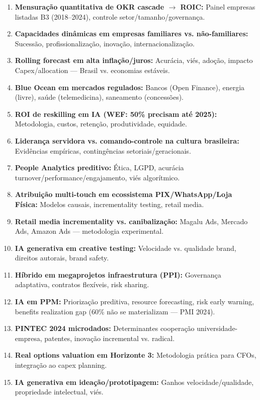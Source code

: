 \begin{enumerate}
    \item \textbf{Mensuração quantitativa de OKR cascade $\rightarrow$ ROIC:} Painel empresas listadas B3 (2018–2024), controle setor/tamanho/governança.
    \item \textbf{Capacidades dinâmicas em empresas familiares vs. não-familiares:} Sucessão, profissionalização, inovação, internacionalização.
    \item \textbf{Rolling forecast em alta inflação/juros:} Acurácia, viés, adoção, impacto Capex/allocation — Brasil vs. economias estáveis.
    \item \textbf{Blue Ocean em mercados regulados:} Bancos (Open Finance), energia (livre), saúde (telemedicina), saneamento (concessões).
    \item \textbf{ROI de reskilling em IA (WEF: 50\% precisam até 2025):} Metodologia, custos, retenção, produtividade, equidade.
    \item \textbf{Liderança servidora vs. comando-controle na cultura brasileira:} Evidências empíricas, contingências setoriais/geracionais.
    \item \textbf{People Analytics preditivo:} Ética, LGPD, acurácia turnover/performance/engajamento, viés algorítmico.
    \item \textbf{Atribuição multi-touch em ecossistema PIX/WhatsApp/Loja Física:} Modelos causais, incrementality testing, retail media.
    \item \textbf{Retail media incrementality vs. canibalização:} Magalu Ads, Mercado Ads, Amazon Ads — metodologia experimental.
    \item \textbf{IA generativa em creative testing:} Velocidade vs. qualidade brand, direitos autorais, brand safety.
    \item \textbf{Híbrido em megaprojetos infraestrutura (PPI):} Governança adaptativa, contratos flexíveis, risk sharing.
    \item \textbf{IA em PPM:} Priorização preditiva, resource forecasting, risk early warning, benefits realization gap (60\% não se materializam — PMI 2024).
    \item \textbf{PINTEC 2024 microdados:} Determinantes cooperação universidade-empresa, patentes, inovação incremental vs. radical.
    \item \textbf{Real options valuation em Horizonte 3:} Metodologia prática para CFOs, integração ao capex planning.
    \item \textbf{IA generativa em ideação/prototipagem:} Ganhos velocidade/qualidade, propriedade intelectual, viés.

\end{enumerate}
